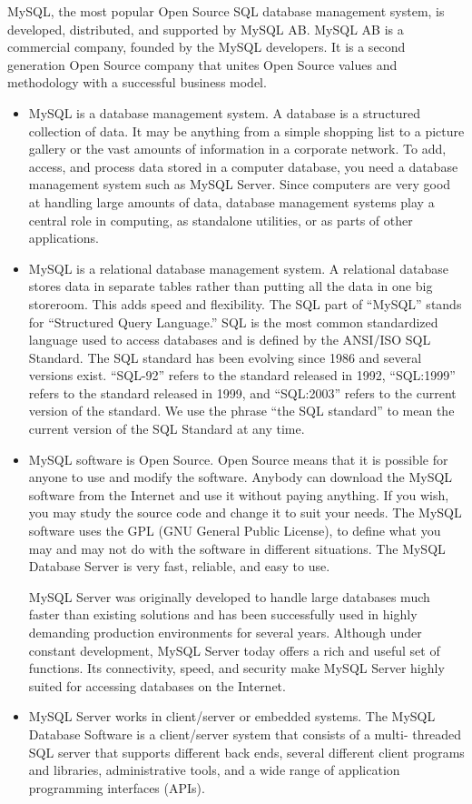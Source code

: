 MySQL, the most popular Open Source SQL database management system, is
developed, distributed, and supported by MySQL AB. MySQL AB is a commercial company,
founded by the MySQL developers. It is a second generation Open Source company that
unites Open Source values and methodology with a successful business model.
\begin{itemize}
\item{MySQL is a database management system.
A database is a structured collection of data. It may be anything from a simple
shopping list to a picture gallery or the vast amounts of information in a corporate
network. To add, access, and process data stored in a computer database, you need a
database management system such as MySQL Server. Since computers are very good
at handling large amounts of data, database management systems play a central role in
computing, as standalone utilities, or as parts of other applications.}
\item{MySQL is a relational database management system.
A relational database stores data in separate tables rather than putting all the data in
one big storeroom. This adds speed and flexibility. The SQL part of “MySQL” stands
for “Structured Query Language.” SQL is the most common standardized language
used to access databases and is defined by the ANSI/ISO SQL Standard. The SQL
standard has been evolving since 1986 and several versions exist. “SQL-92” refers to
the standard released in 1992, “SQL:1999” refers to the standard released in 1999, and
“SQL:2003” refers to the current version of the standard. We use the phrase “the SQL
standard” to mean the current version of the SQL Standard at any time.}
\item{MySQL software is Open Source.
Open Source means that it is possible for anyone to use and modify the software.
Anybody can download the MySQL software from the Internet and use it without
paying anything. If you wish, you may study the source code and change it to suit
your needs. The MySQL software uses the GPL (GNU General Public License), to
define what you may and may not do with the software in different situations. The
MySQL Database Server is very fast, reliable, and easy to use.

MySQL Server was originally developed to handle large databases much faster than
existing solutions and has been successfully used in highly demanding production
environments for several years. Although under constant development, MySQL
Server today offers a rich and useful set of functions. Its connectivity, speed, and
security make MySQL Server highly suited for accessing databases on the Internet.}
\item{MySQL Server works in client/server or embedded systems.
The MySQL Database Software is a client/server system that consists of a multi-
threaded SQL server that supports different back ends, several different client
programs and libraries, administrative tools, and a wide range of application
programming interfaces (APIs).}
\end{itemize}


